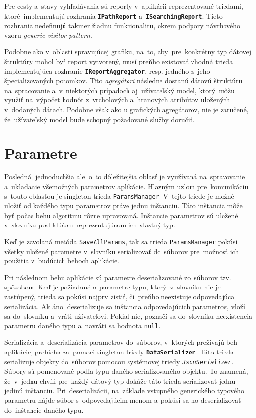 \bigskip

Pre cesty a~stavy vyhľadávania sú reporty v~aplikácii reprezentované triedami, ktoré~implementujú rozhrania \textbf{\texttt{IPathReport}} a~\textbf{\texttt{ISearchingReport}}. Tieto rozhrania nedefinujú takmer žiadnu funkcionalitu, okrem podpory návrhového vzoru \textit{generic visitor pattern}.

Podobne ako v~oblasti spravujúcej grafiku, na~to, aby~pre~konkrétny typ dátovej štruktúry mohol byť report vytvorený, musí preňho existovať vhodná trieda implementujúca rozhranie \textbf{\texttt{IReportAggregator}}, resp. jedného z~jeho špecializovaných potomkov. Títo \textit{agregátori} následne dostanú dátovú štruktúru na~spracovanie a~v~niektorých prípadoch aj~užívateľský model, ktorý~môžu využiť na~výpočet hodnôt z~vrcholových a~hranových atribútov uložených v~dodaných dátach. Podobne však ako u grafických agregátorov, nie je zaručené, že~užívateľský model bude schopný požadované služby doručiť. 

\section{Parametre}

Posledná, jednoduchšia ale~o~to dôležitejšia oblasť je využívaná na~spravovanie a~ukladanie všemožných parametrov aplikácie. Hlavným uzlom pre~komunikáciu s~touto oblasťou je singleton trieda \texttt{ParamsManager}. V~tejto triede je možné uložiť od každého typu parametrov práve jednu inštanciu. Táto inštancia môže byť počas behu algoritmu rôzne upravovaná. Inštancie parametrov sú uložené v~slovníku pod kľúčom reprezentujúcom ich vlastný typ.  

Keď je zavolaná metóda \texttt{SaveAllParams}, tak sa trieda \texttt{ParamsManager} pokúsi všetky uložené parametre v~slovníku serializovať do~súborov pre~možnosť ich použitia v~budúcich behoch aplikácie.

Pri následnom behu aplikácie sú parametre deserializované zo~súborov tzv.  spôsobom. Keď je požiadané o~parametre typu, ktorý~v~slovníku nie je zastúpený, trieda sa pokúsi najprv zistiť, či~preňho neexistuje odpovedajúca serializácia. Ak áno, deserializuje sa inštancia odpovedajúcich parametrov, vloží sa do~slovníku a~vráti užívateľovi. Pokiaľ nie, poznačí sa do~slovníku neexistencia parametru daného typu a~navráti sa hodnota \texttt{null}.  

Serializácia a~deserializácia parametrov do~súborov, v~ktorých prežívajú beh aplikácie, prebieha za~pomoci singleton triedy \textbf{\texttt{DataSerializer}}. Táto trieda serializuje objekty do~súborov pomocou systémovej triedy \textit{\texttt{JsonSerializer}}. Súbory sú pomenované podľa typu daného serializovaného objektu. To znamená, že~v~jednu chvíli pre~každý dátový typ dokáže táto trieda serializovať jednu jedinú inštanciu. Pri~deserializácii, na~základe vstupného generického typového parametru nájde súbor s~odpovedajúcim menom a~pokúsi sa ho deserializovať do~inštancie daného typu.


  
